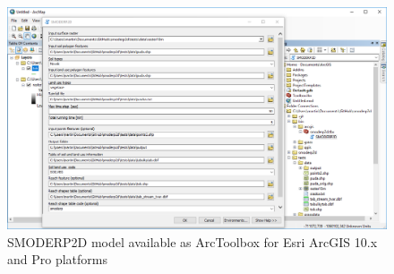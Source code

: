 \begin{figure}[ht!]
  \begin{center}
    \includegraphics[width=1.0\columnwidth]{figures/smoderp2d_arcgis.png}
    \caption{SMODERP2D model available as ArcToolbox for Esri ArcGIS
      10.x and Pro platforms}
    \label{fig:smoderp2d_arcgis}
  \end{center}
\end{figure}
